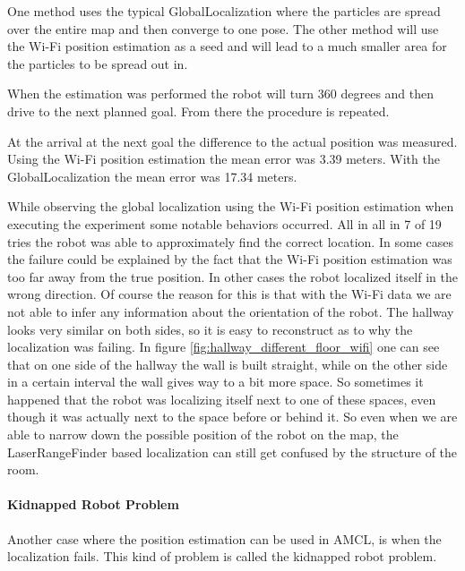 One method uses the typical \gls{GlobalLocalization} where the particles are spread over the entire map and then converge to one pose. The other method will use the Wi-Fi position estimation as a seed and will lead to a much smaller area for the particles to be spread out in. 

When the estimation was performed the robot will turn 360 degrees and then drive to the next planned goal. From there the procedure is repeated. 

At the arrival at the next goal the difference to the actual position was measured. Using the Wi-Fi position estimation the mean error was 3.39 meters. With the \gls{GlobalLocalization} the mean error was 17.34 meters. 

While observing the global localization using the Wi-Fi position estimation when executing the experiment some notable behaviors occurred. All in all in 7 of 19 tries the robot was able to approximately find the correct location. In some cases the failure could be explained by the fact that the Wi-Fi position estimation was too far away from the true position. In other cases the robot localized itself in the wrong direction. Of course the reason for this is that with the Wi-Fi data we are not able to infer any information about the orientation of the robot. The hallway looks very similar on both sides, so it is easy to reconstruct as to why the localization was failing. In figure \ref{fig:hallway_different_floor_wifi} one can see that on one side of the hallway the wall is built straight, while on the other side in a certain interval the wall gives way to a bit more space. So sometimes it happened that the robot was localizing itself next to one of these spaces, even though it was actually next to the space before or behind it. So even when we are able to narrow down the possible position of the robot on the map, the \gls{LaserRangeFinder} based localization can still get confused by the structure of the room. 
\paragraph{Kidnapped Robot Problem}
Another case where the position estimation can be used in AMCL, is when the localization fails. This kind of problem is called the kidnapped robot problem. 

